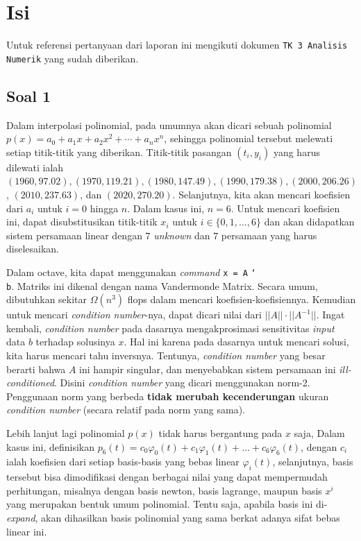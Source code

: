 \documentclass[11pt, a4paper, onecolumn, oneside, final]{report}
\begin{document}
\section*{Isi}
Untuk referensi pertanyaan dari laporan ini mengikuti dokumen \texttt{TK 3 Analisis Numerik} yang sudah diberikan. 

\subsection*{Soal 1}

Dalam interpolasi polinomial, pada umumnya akan dicari sebuah polinomial $p(x) = a_0 + a_1x + a_2x^2 + \cdots + a_nx^n$, sehingga polinomial tersebut melewati setiap titik-titik yang diberikan. Titik-titik pasangan $(t_i, y_i)$ yang harus dilewati ialah $(1960, 97.02), (1970, 119.21), (1980, 147.49), (1990, 179.38), (2000, 206.26)$, $(2010, 237.63)$, dan $(2020, 270.20)$. Selanjutnya, kita akan mencari koefisien dari $a_i$ untuk $i = 0$ hingga $n$. Dalam kasus ini, $n = 6$. Untuk mencari koefisien ini, dapat disubstitusikan titik-titik $x_i$ untuk $i \in \{0, 1, \dots, 6\}$ dan akan didapatkan sistem persamaan linear dengan $7$ \textit{unknown} dan $7$ persamaan yang harus diselesaikan.

Dalam octave, kita dapat menggunakan \textit{command} \texttt{x = A} \texttt{\char`\\} \texttt{b}. Matriks ini dikenal dengan nama Vandermonde Matrix. Secara umum, dibutuhkan sekitar $\Omega (n^3)$ flops dalam mencari koefisien-koefisiennya. Kemudian untuk mencari \textit{condition number}-nya, dapat dicari nilai dari $||A|| \cdot ||A^{-1}||$. Ingat kembali, \textit{condition number} pada dasarnya mengakprosimasi sensitivitas \textit{input} data $b$ terhadap solusinya $x$. Hal ini karena pada dasarnya untuk mencari solusi, kita harus mencari tahu inversnya. Tentunya, \textit{condition number} yang besar berarti bahwa $A$ ini hampir singular, dan menyebabkan sistem persamaan ini \textit{ill-conditioned}. Disini \textit{condition number} yang dicari menggunakan norm-2. Penggunaan norm yang berbeda \textbf{tidak merubah kecenderungan} ukuran \textit{condition number} (secara relatif pada norm yang sama).

Lebih lanjut lagi polinomial $p(x)$ tidak harus bergantung pada $x$ saja, Dalam kasus ini, definisikan $p_{6}(t)=c_{0} \varphi_{0}(t)+c_{1} \varphi_{1}(t)+\ldots+c_{6} \varphi_{6}(t)$, dengan $c_{i}$ ialah koefisien dari setiap basis-basis yang bebas linear $\varphi_{i}(t)$, selanjutnya, basis tersebut bisa dimodifikasi dengan berbagai nilai yang dapat mempermudah perhitungan, misalnya dengan basis newton, basis lagrange, maupun basis $x^i$ yang merupakan bentuk umum polinomial. Tentu saja, apabila basis ini di-\textit{expand}, akan dihasilkan basis polinomial yang sama berkat adanya sifat bebas linear ini.
\end{document}
